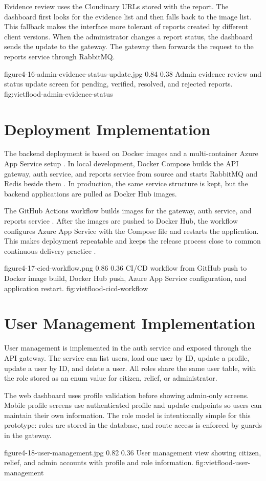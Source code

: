 Evidence review uses the Cloudinary URLs stored with the report. The dashboard first looks for the evidence list and then falls back to the image list. This fallback makes the interface more tolerant of reports created by different client versions. When the administrator changes a report status, the dashboard sends the update to the gateway. The gateway then forwards the request to the reports service through RabbitMQ.

\vfplaceholderfigure
    {figure4-16-admin-evidence-status-update.jpg}
    {0.84}
    {0.38}
    {Admin evidence review and status update screen for pending, verified, resolved, and rejected reports.}
    {fig:vietflood-admin-evidence-status}

\section{Deployment Implementation}

The backend deployment is based on Docker images and a multi-container Azure App Service setup \cite{azureAppServiceContainersDocs}. In local development, Docker Compose builds the API gateway, auth service, and reports service from source and starts RabbitMQ and Redis beside them \cite{dockerComposeDocs}. In production, the same service structure is kept, but the backend applications are pulled as Docker Hub images.

The GitHub Actions workflow builds images for the gateway, auth service, and reports service \cite{githubActionsDocs}. After the images are pushed to Docker Hub, the workflow configures Azure App Service with the Compose file and restarts the application. This makes deployment repeatable and keeps the release process close to common continuous delivery practice \cite{humble2010continuousDelivery,kim2016devopsHandbook}.

\vfplaceholderfigure
    {figure4-17-cicd-workflow.png}
    {0.86}
    {0.36}
    {CI/CD workflow from GitHub push to Docker image build, Docker Hub push, Azure App Service configuration, and application restart.}
    {fig:vietflood-cicd-workflow}

\section{User Management Implementation}

User management is implemented in the auth service and exposed through the API gateway. The service can list users, load one user by ID, update a profile, update a user by ID, and delete a user. All roles share the same user table, with the role stored as an enum value for citizen, relief, or administrator.

The web dashboard uses profile validation before showing admin-only screens. Mobile profile screens use authenticated profile and update endpoints so users can maintain their own information. The role model is intentionally simple for this prototype: roles are stored in the database, and route access is enforced by guards in the gateway.

\vfplaceholderfigure
    {figure4-18-user-management.jpg}
    {0.82}
    {0.36}
    {User management view showing citizen, relief, and admin accounts with profile and role information.}
    {fig:vietflood-user-management}
